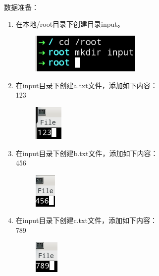 \documentclass {article}
\begin{document}
				数据准备：
				\begin{enumerate}
					\item 在本地/root目录下创建目录input。
					\begin{figure}[H]
						\centering
						\includegraphics{figures/fig27.png}
					\end{figure}
				
					\item 在input目录下创建a.txt文件，添加如下内容：\\
					123
					
					\begin{figure}[H]
						\centering
						\includegraphics{figures/fig28.png}
					\end{figure}
				
					\item 在input目录下创建b.txt文件，添加如下内容：\\
					456
					
					\begin{figure}[H]
						\centering
						\includegraphics{figures/fig29.png}
					\end{figure}
					
					\item 在input目录下创建c.txt文件，添加如下内容：\\
					789
					
					\begin{figure}[H]
						\centering
						\includegraphics{figures/fig30.png}
					\end{figure}
				\end{enumerate}
			
\end{document}

